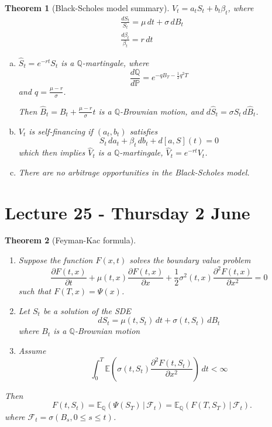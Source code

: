 \documentclass[10pt, oneside, reqno]{amsart}
\theoremstyle{plain}%
\newtheorem{thm}{Theorem}[section]
\theoremstyle{definition}
\theoremstyle{remark}
\newcommand{\given}{ \, | \,}
\newcommand{\Q}{\mathbb{Q}}
\renewcommand{\P}{\mathbb{P}}
\newcommand{\E}{\mathbb{E}}
\newcommand{\sigf}{\mathcal{F}}
\begin{document}
\begin{thm}[Black-Scholes model summary]
    $V_t = a_t S_t + b_t \beta_t$, where \begin{align*}
        \frac{dS_t}{S_t} = \mu \, dt + \sigma \, dB_t \\
        \frac{d\beta_t}{\beta_t} = r \, dt 
    \end{align*} 
    
    \begin{enumerate}[(a)]
        \item $\hat S_t = e^{-rt} S_t$ is a $\Q$-martingale, where \[
            \frac{d\Q}{d\P} = e^{-qB_T - \frac{1}{2} q^2 T}
        \] and $q = \frac{\mu - r}{\sigma}$.  
        
        Then $\hat B_t = B_t + \frac{\mu - r}{\sigma} t$ is a $\Q$-Brownian motion, and $d \hat S_t = \sigma \hat S_t \, d\hat B_t$.
        \item $V_t$ is self-financing if $(a_t, b_t)$ satisfies \[
            S_t \, da_t + \beta_t \, db_t + d[a, S](t) = 0
        \] which then implies $\hat V_t$ is a $\Q$-martingale, $\hat V_t = e^{-rt}V_t$.         
        \item
        There are no arbitrage opportunities in the Black-Scholes model.
    \end{enumerate}
\end{thm}

\section{Lecture 25 - Thursday 2 June} %
\label{sec:lecture_25_thursday_2_june}
\begin{thm}[Feyman-Kac formula]{\ }
    \begin{enumerate}[(1)]
        \item Suppose the function $F(x, t)$ solves the boundary value problem \[
            \frac{\partial F(t, x)}{\partial t} + \mu(t, x) \frac{\partial F(t, x)}{\partial x} + \frac{1}{2} \sigma^2(t, x) \frac{\partial^2 F(t, x)}{\partial x^2} = 0
    \] such that $F(T, x) = \Psi(x)$.  
        \item Let $S_t$ be a solution of the SDE \[
            dS_t = \mu(t, S_t) \, dt + \sigma(t, S_t) \, dB_t \tag{$\star$}
        \] where $B_t$ is a $\Q$-Brownian motion
        \item Assume \[
            \int_0^T \E(\sigma(t, S_t) \frac{\partial^2 F(t, S_t)}{\partial x^2}) \, dt < \infty
        \]
    \end{enumerate} 
    
    Then \[
        F(t, S_t) = \E_\Q\left( \Psi(S_T) \given \sigf_t \right) = \E_\Q\left(F(T, S_T) \given \sigf_t \right).
    \] where $\sigf_t = \sigma(B_s, 0 \leq s \leq t)$. 
\end{thm}
\end{document}
